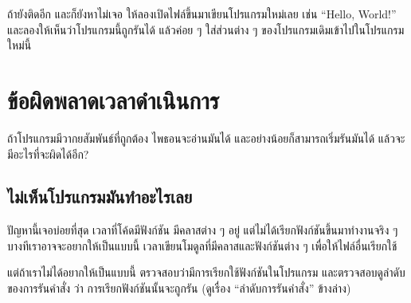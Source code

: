 ถ้ายังติดอีก และก็ยังหาไม่เจอ ให้ลองเปิดไฟล์ขึ้นมาเขียนโปรแกรมใหม่เลย เช่น ``Hello, World!'' และลองให้เห็นว่าโปรแกรมนี้ถูกรันได้
แล้วค่อย ๆ ใส่ส่วนต่าง ๆ ของโปรแกรมเดิมเข้าไปในโปรแกรมใหม่นี้

\section{ข้อผิดพลาดเวลาดำเนินการ}


ถ้าโปรแกรมมีวากยสัมพันธ์ที่ถูกต้อง
ไพธอนจะอ่านมันได้ และอย่างน้อยก็สามารถเริ่มรันมันได้
แล้วจะมีอะไรที่จะผิดได้อีก?

\subsection{ไม่เห็นโปรแกรมมันทำอะไรเลย}


ปัญหานี้เจอบ่อยที่สุด เวลาที่โค้ดมีฟังก์ชัน มีคลาสต่าง ๆ อยู่
แต่ไม่ได้เรียกฟังก์ชันขึ้นมาทำงานจริง ๆ
บางทีเราอาจจะอยากให้เป็นแบบนี้ เวลาเขียนโมดูลที่มีคลาสและฟังก์ชันต่าง ๆ เพื่อให้ไฟล์อื่นเรียกใช้


แต่ถ้าเราไม่ได้อยากให้เป็นแบบนี้
ตรวจสอบว่ามีการเรียกใช้ฟังก์ชันในโปรแกรม
และตรวจสอบดูลำดับของการรันคำสั่ง ว่า การเรียกฟังก์ชันนั้นจะถูกรัน 
(ดูเรื่อง ``ลำดับการรันคำสั่ง'' ข้างล่าง)


